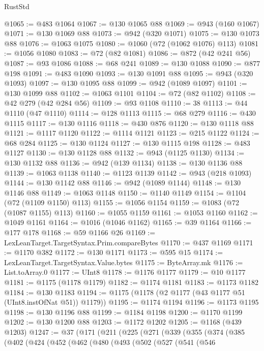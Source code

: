 \begin{lexlean}{RustStd}
\begin{coremodule}
@1065 := @483 @1064
@1067 := @130 @1065 @88
@1069 := @943 (@160 @1067)
@1071 := @130 @1069 @88
@1073 := @942 (@320 @1071)
@1075 := @130 @1073 @88
@1076 := @1063 @1075
@1080 := @1060 (@72 (@1062 @1076) @113)
@1081 := @1056 @1080
@1083 := @72 (@82 @1081)
@1086 := @872 (@42 @241 @56)
@1087 := @93 @1086
@1088 := @68 @241
@1089 := @130 @1088
@1090 := @877 @198
@1091 := @483 @1090
@1093 := @130 @1091 @88
@1095 := @943 (@320 @1093)
@1097 := @130 @1095 @88
@1099 := @942 (@1089 @1097)
@1101 := @130 @1099 @88
@1102 := @1063 @1101
@1104 := @72 (@82 @1102)
@1108 := @42 @279 (@42 @284 @56)
@1109 := @93 @1108
@1110 := 38
@1113 := @44 @1110 (@47 @1110)
@1114 := @128 @1113
@1115 := @68 @279
@1116 := @430 @1115
@1117 := @130 @1116
@1118 := @430 @876
@1120 := @130 @1118 @88
@1121 := @1117 @1120
@1122 := @1114 @1121
@1123 := @215 @1122
@1124 := @68 @284
@1125 := @130 @1124
@1127 := @130 @1115 @198
@1128 := @483 @1127
@1130 := @130 @1128 @88
@1132 := @943 (@1125 @1130)
@1134 := @130 @1132 @88
@1136 := @942 (@139 @1134)
@1138 := @130 @1136 @88
@1139 := @1063 @1138
@1140 := @1123 @1139
@1142 := @943 (@218 @1093)
@1144 := @130 @1142 @88
@1146 := @942 (@1089 @1144)
@1148 := @130 @1146 @88
@1149 := @1063 @1148
@1150 := @1140 @1149
@1154 := @1104 (@72 (@1109 @1150) @113)
@1155 := @1056 @1154
@1159 := @1083 (@72 (@1087 @1155) @113)
@1160 := @1055 @1159
@1161 := @1053 @1160
@1162 := @1049 @1161
@1164 := @1016 (@1046 @1162)
@1165 := @39 @1164
@1166 := @177 @178
@1168 := @59 @1166 @26
@1169 := LexLeanTarget.TargetSyntax.Prim.compareBytes
@1170 := @437 @1169
@1171 := @1170 @382
@1172 := @130 @1171
@1173 := @595 @15
@1174 := LexLeanTarget.TargetSyntax.Value.bytes
@1175 := ByteArray.mk
@1176 := List.toArray.{0}
@1177 := UInt8
@1178 := @1176 @1177
@1179 := @10 @1177
@1181 := @1175 (@1178 @1179)
@1182 := @1174 @1181
@1183 := @1173 @1182
@1184 := @130 @1183
@1194 := @1175 (@1178 (@2 @1177 (@43 @1177 @51 (UInt8.instOfNat @51)) @1179))
@1195 := @1174 @1194
@1196 := @1173 @1195
@1198 := @130 @1196 @88
@1199 := @1184 @1198
@1200 := @1170 @1199
@1202 := @130 @1200 @88
@1203 := @1172 @1202
@1205 := @1168 (@439 @1203)
@1247 := @37
    (@171
      (@211
        (@225
          (@271
            (@339
              (@355
                (@374
                  (@385
                    (@402
                      (@424
                        (@452
                          (@462
                            (@480
                              (@493
                                (@502
                                  (@527
                                    (@541
                                      (@546

\end{coremodule}
\end{lexlean}
